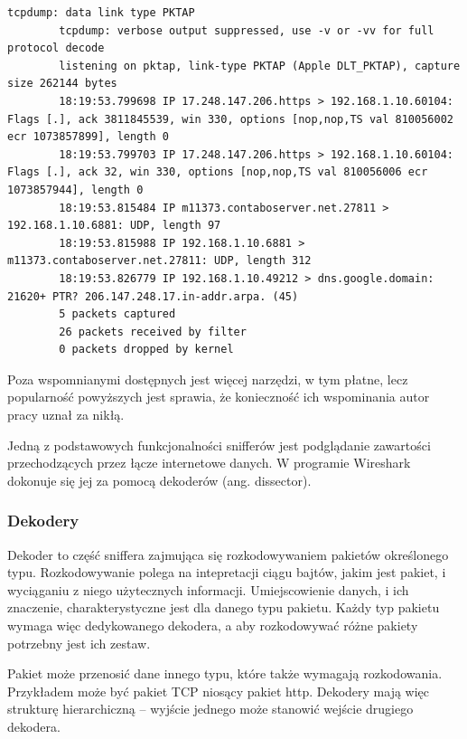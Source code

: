 \documentclass[a4paper, 12pt, twoside, openright]{article}
\begin{document}
	\begin{minipage}{\linewidth}
		\begin{lstlisting}[style=CStyle,caption={Przykładowy output programu \texttt{tcpdump}}]
		tcpdump: data link type PKTAP
		tcpdump: verbose output suppressed, use -v or -vv for full protocol decode
		listening on pktap, link-type PKTAP (Apple DLT_PKTAP), capture size 262144 bytes
		18:19:53.799698 IP 17.248.147.206.https > 192.168.1.10.60104: Flags [.], ack 3811845539, win 330, options [nop,nop,TS val 810056002 ecr 1073857899], length 0
		18:19:53.799703 IP 17.248.147.206.https > 192.168.1.10.60104: Flags [.], ack 32, win 330, options [nop,nop,TS val 810056006 ecr 1073857944], length 0
		18:19:53.815484 IP m11373.contaboserver.net.27811 > 192.168.1.10.6881: UDP, length 97
		18:19:53.815988 IP 192.168.1.10.6881 > m11373.contaboserver.net.27811: UDP, length 312
		18:19:53.826779 IP 192.168.1.10.49212 > dns.google.domain: 21620+ PTR? 206.147.248.17.in-addr.arpa. (45)
		5 packets captured
		26 packets received by filter
		0 packets dropped by kernel \end{lstlisting}
	\end{minipage}


	Poza wspomnianymi dostępnych jest więcej narzędzi, w tym płatne, lecz popularność powyższych jest sprawia,
	że konieczność ich wspominania autor pracy uznał za nikłą.

	Jedną z podstawowych funkcjonalności snifferów jest podglądanie zawartości przechodzących przez łącze internetowe danych.
	W programie Wireshark dokonuje się jej za pomocą dekoderów (ang. dissector).

	\newpage
	\subsubsection{Dekodery}
	\indent\par
	Dekoder to część sniffera zajmująca się rozkodowywaniem pakietów określonego typu. Rozkodowywanie polega na intepretacji
	ciągu bajtów, jakim jest pakiet, i wyciąganiu z niego użytecznych informacji. Umiejscowienie danych, i ich znaczenie,
	charakterystyczne jest dla danego typu pakietu. Każdy typ pakietu wymaga więc dedykowanego dekodera, a aby rozkodowywać
	różne pakiety potrzebny jest ich zestaw.

	Pakiet może przenosić dane innego typu, które także wymagają rozkodowania. Przykładem może być pakiet TCP niosący pakiet
	http. Dekodery mają więc strukturę hierarchiczną -- wyjście jednego może stanowić wejście drugiego dekodera.
\end{document}

